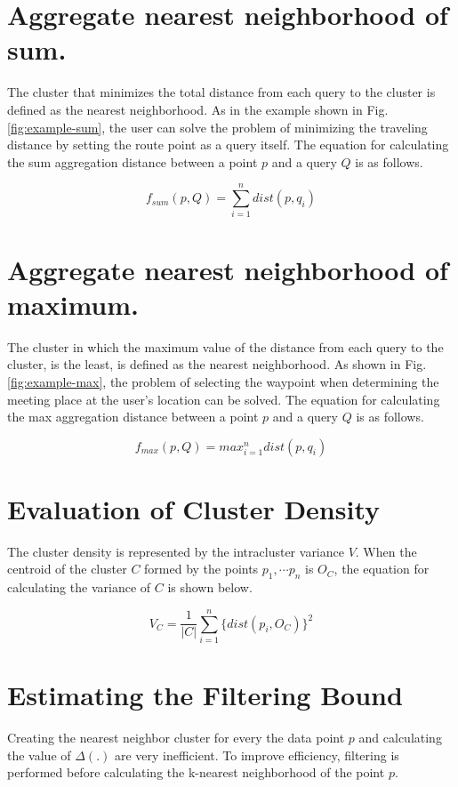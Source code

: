 \documentclass[a4paper,11pt]{report}
\theoremstyle{mytheoremstyle}
\begin{document}
\section{Aggregate nearest neighborhood of sum.}
The cluster that minimizes the total distance from each query to the cluster is defined as the nearest neighborhood. As in the example shown in Fig. \ref{fig:example-sum}, the user can solve the problem of minimizing the traveling distance by setting the route point as a query itself. The equation for calculating the sum aggregation distance between a point $p$ and a query $Q$ is as follows.

\begin{equation}
\label{equ:f-sum}
f_{sum}(p,Q) = \sum_{i=1}^{n} dist(p,q_i)
\end{equation}

\section{Aggregate nearest neighborhood of maximum.}

The cluster in which the maximum value of the distance from each query to the cluster, is the least, is defined as the nearest neighborhood. As shown in Fig. \ref{fig:example-max}, the problem of selecting the waypoint when determining the meeting place at the user's location can be solved. The equation for calculating the max aggregation distance between a point $p$ and a query $Q$ is as follows.

\begin{equation}
\label{equ:f-max}
f_{max}(p,Q) = max_{i=1}^{n} dist(p,q_i)
\end{equation}

\section{Evaluation of Cluster Density}
The cluster density is represented by the intracluster variance $V$. When the centroid of the cluster $C$ formed by the points $p_1, \cdots p_n$ is $O_C$, the equation for calculating the variance of $C$ is shown below.

\begin{equation}
\label{equ:w}
V_C = \frac{1}{|C|} \sum_{i=1}^{n} \{dist(p_i, O_C)\}^2 
\end{equation}

\section{Estimating the Filtering Bound}
\label{subsection:filtering}
Creating the nearest neighbor cluster for every the data point $p$ and calculating the value of $\Delta(.)$ are very inefficient. To improve efficiency, filtering is performed before calculating the k-nearest neighborhood of the point $p$.
\end{document}
